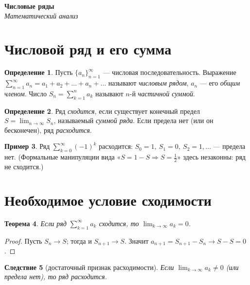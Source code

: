 \documentclass[11pt,a4paper]{article}
\newcommand{\coursename}{Математический анализ}
\newcommand{\doctitle}{Числовые ряды}
\theoremstyle{definition}
\newtheorem{definition}{Определение}[section]
\newtheorem{example}[definition]{Пример}
\theoremstyle{plain}
\newtheorem{theorem}[definition]{Теорема}
\newtheorem{corollary}[definition]{Следствие}
\begin{document}
\begin{center}
  {\LARGE\bfseries \doctitle}\\[4pt]
  {\large\itshape \coursename}
\end{center}
\vspace{6pt}

\section{Числовой ряд и его сумма}

\begin{definition}
Пусть $\{a_n\}_{n=1}^\infty$ — числовая последовательность. Выражение
$\displaystyle\sum_{n=1}^{\infty}a_n=a_1+a_2+\dots+a_n+\dots$ называют \emph{числовым рядом}, $a_n$
— его \emph{общим членом}. Число $\displaystyle S_n=\sum_{k=1}^{n}a_k$ называют $n$-й
\emph{частичной суммой}.
\end{definition}

\begin{definition}
Ряд \emph{сходится}, если существует конечный предел $\displaystyle S=\lim_{n\to\infty}S_n$,
называемый \emph{суммой ряда}. Если предела нет (или он бесконечен), ряд \emph{расходится}.
\end{definition}

\begin{example}
Ряд $\displaystyle\sum_{k=0}^{\infty}(-1)^k$ расходится: $S_0=1,\ S_1=0,\ S_2=1,\dots$ — предела
нет. (Формальные манипуляции вида «$S=1-S\Rightarrow S=\tfrac12$» здесь незаконны: ряд не
сходится.)
\end{example}

\section{Необходимое условие сходимости}

\begin{theorem}
Если ряд $\displaystyle\sum_{k=1}^{\infty}a_k$ сходится, то $\displaystyle\lim_{k\to\infty}a_k=0$.
\end{theorem}

\begin{proof}
Пусть $S_n\to S$; тогда и $S_{n+1}\to S$. Значит $a_{n+1}=S_{n+1}-S_n\to S-S=0$.
\end{proof}

\begin{corollary}[достаточный признак расходимости]
Если $\displaystyle\lim_{k\to\infty}a_k\ne0$ (или предела нет), то ряд расходится.
\end{corollary}
\end{document}
